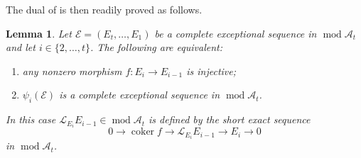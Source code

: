 \documentclass[10pt,twoside, a4paper,reqno]{amsart}
\DeclareMathOperator{\mods}{mod}
\DeclareMathOperator{\coker}{coker}
\newcommand{\A}{\mathscr{A}}
\newcommand{\Ecal}{\mathcal{E}}
\newcommand{\Lcal}{\mathcal{L}}
\newtheorem{lemma}[theorem]{Lemma}
\theoremstyle{definition}
\begin{document}
The dual of \cite[Lem. 4.7, Cor. 4.8]{HillePloog2019} is then readily proved as follows.
\begin{lemma}\label{lem:excepmutdesc}
    Let $\Ecal = (E_t, \dots, E_1)$ be a complete exceptional sequence in $\mods \A_t$ and let $i \in \{2, \dots, t\}$. The following are equivalent:
    \begin{enumerate}
        \item any nonzero morphism $f: E_{i} \to E_{i-1}$ is injective;
        \item $\psi_i(\Ecal)$ is a complete exceptional sequence in $\mods \A_t$.
    \end{enumerate} 
    In this case $\Lcal_{E_i} E_{i-1} \in \mods \A_t$ is defined by the short exact sequence
    \begin{equation}\label{eq:leftmutseq} 0 \to \coker f \to \Lcal_{E_i} E_{i-1} \to E_i \to 0\end{equation}
    in $\mods \A_t$.
\end{lemma}
\end{document}
